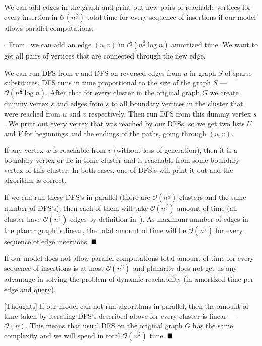 \begin{proposition}
We can add edges in the graph and print out new pairs of reachable vertices for every insertion in $\mathcal{O}(n^{\frac{5}{3}})$ total time for every sequence of insertions if our model allows parallel computations.
\end{proposition}

$\square$
From~\cite{10.5555/647903.739284} we can add an edge $(u, v)$ in $\mathcal{O}(n^{\frac{2}{3}}\log n)$ amortized time. We want to get all pairs of vertices that are connected through the new edge.

We can run DFS from $v$ and DFS on reversed edges from $u$ in graph $S$ of sparse substitutes. DFS runs in time proportional to the size of the graph $S$ --- $\mathcal{O}(n^{\frac{2}{3}} \log n)$. After that for every cluster in the original graph $G$ we create dummy vertex $s$ and edges from $s$ to all boundary vertices in the cluster that were reached from $u$ and $v$ respectively. Then run DFS from this dummy vertex $s$. We print out every vertex that was reached by our DFSs, so we get two lists $U$ and $V$ for beginnings and the endings of the paths, going through $(u, v)$.

If any vertex $w$ is reachable from $v$ (without loss of generation), then it is a boundary vertex or lie in some cluster and is reachable from some boundary vertex of this cluster. In both cases, one of DFS's will print it out and the algorithm is correct. 

If we can run these DFS's in parallel (there are $\mathcal{O}(n^{\frac{1}{3}})$ clusters and the same number of DFS's), then each of them will take $\mathcal{O}(n^{\frac{2}{3}})$ amount of time (all cluster have $\mathcal{O}(n^{\frac{2}{3}})$ edges by definition in~\cite{10.5555/647903.739284}). As maximum number of edges in the planar graph is linear, the total amount of time will be $\mathcal{O}(n^{\frac{5}{3}})$ for every sequence of edge insertions.
$\hfill\blacksquare$

\begin{conjecture}
If our model does not allow parallel computations total amount of time for every sequence of insertions is at most $\mathcal{O}(n^2)$ and planarity does not get us any advantage in solving the problem of dynamic reachability (in amortized time per edge and query).
\end{conjecture}

[Thoughts]
If our model can not run algorithms in parallel, then the amount of time taken by iterating DFS's described above for every cluster is linear --- $\mathcal{O}(n)$. This means that usual DFS on the original graph $G$ has the same complexity and we will spend in total $\mathcal{O}(n^2)$ time.
$\hfill\blacksquare$

